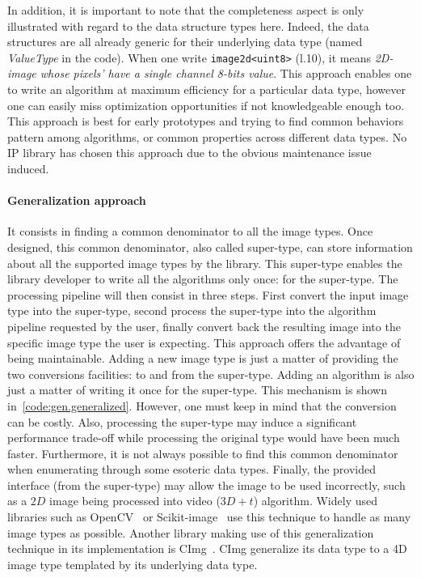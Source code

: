 In addition, it is important to note that the completeness aspect is only illustrated with regard to the data structure
types here. Indeed, the data structures are all already generic for their underlying data type (named \emph{ValueType}
in the code). When one write \texttt{image2d<uint8>} (l.10), it means \emph{2D-image whose pixels' have a single channel
  8-bits value}. This approach enables one to write an algorithm at maximum efficiency for a particular data type, however
one can easily miss optimization opportunities if not knowledgeable enough too. This approach is best for early
prototypes and trying to find common behaviors pattern among algorithms, or common properties across different data
types. No IP library has chosen this approach due to the obvious maintenance issue induced.

\paragraph{Generalization approach} It consists in finding a common denominator to all the image types. Once designed,
this common denominator, also called super-type, can store information about all the supported image types by the
library. This super-type enables the library developer to write all the algorithms only once: for the super-type. The
processing pipeline will then consist in three steps. First convert the input image type into the super-type, second
process the super-type into the algorithm pipeline requested by the user, finally convert back the resulting image into
the specific image type the user is expecting. This approach offers the advantage of being maintainable. Adding a new
image type is just a matter of providing the two conversions facilities: to and from the super-type. Adding an algorithm
is also just a matter of writing it once for the super-type. This mechanism is shown in~\cref{code:gen.generalized}.
However, one must keep in mind that the conversion can be costly. Also, processing the super-type may induce a
significant performance trade-off while processing the original type would have been much faster. Furthermore, it is not
always possible to find this common denominator when enumerating through some esoteric data types. Finally, the provided
interface (from the super-type) may allow the image to be used incorrectly, such as a \(2D\) image being processed into
video (\(3D+t\)) algorithm. Widely used libraries such as OpenCV~\parencite{bradski.2000.opencv} or
Scikit-image~\parencite{vanderwalt.2014.skimage} use this technique to handle as many image types as possible. Another
library making use of this generalization technique in its implementation is CImg~\parencite{tschumperle.2012.cimg}.
CImg generalize its data type to a 4D image type templated by its underlying data type.

